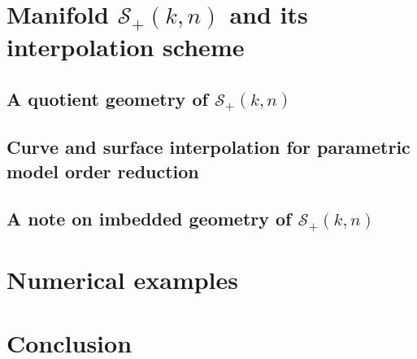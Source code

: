 \section{Manifold $\mathcal{S}_+(k,n)$ and its interpolation scheme}\label{Sec:Manifold}
\subsection{A quotient geometry of $\mathcal{S}_+(k,n)$}
\subsection{Curve and surface interpolation for parametric model order reduction}
\subsection{A note on imbedded geometry of $\mathcal{S}_+(k,n)$}

\section{Numerical examples}\label{Sec:NumerExam}


\section{Conclusion}\label{Sec:Concl}





%
%



